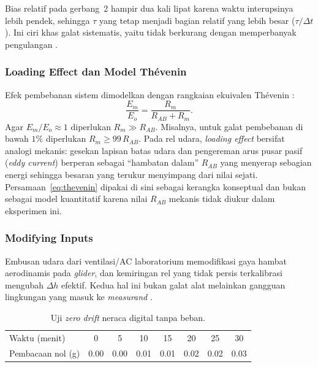 \documentclass[a4paper, 12pt]{article}
\begin{document}
\begin{multicols}{2}
            Bias relatif pada gerbang~2 hampir dua kali lipat karena waktu interupsinya lebih pendek, sehingga $\tau$ yang tetap menjadi bagian relatif yang lebih besar ($\tau/\Delta t$). Ini ciri khas galat sistematis, yaitu tidak berkurang dengan memperbanyak pengulangan \parencite{Taylor1997}.

            \subsubsection{Loading Effect dan Model Th\'evenin}
            Efek pembebanan sistem dimodelkan dengan rangkaian ekuivalen Th\'evenin \parencite{Bentley2005}:
            \begin{equation}
                \frac{E_m}{E_o}=\frac{R_m}{R_{AB}+R_m}.
                \label{eq:thevenin}
            \end{equation}
            Agar $E_m/E_o\approx1$ diperlukan $R_m\gg R_{AB}$. Misalnya, untuk galat pembebanan di bawah $1\%$ diperlukan $R_m\ge 99\,R_{AB}$. Pada rel udara, \textit{loading effect} bersifat analogi mekanis: gesekan lapisan batas udara dan pengereman arus pusar pasif (\textit{eddy current}) berperan sebagai ``hambatan dalam'' $R_{AB}$ yang menyerap sebagian energi sehingga besaran yang terukur menyimpang dari nilai sejati. Persamaan~\eqref{eq:thevenin} dipakai di sini sebagai kerangka konseptual dan bukan sebagai model kuantitatif karena nilai $R_{AB}$ mekanis tidak diukur dalam eksperimen ini.

            \subsubsection{Modifying Inputs}
            Embusan udara dari ventilasi/AC laboratorium memodifikasi gaya hambat aerodinamis pada \textit{glider}, dan kemiringan rel yang tidak persis terkalibrasi mengubah $\Delta h$ efektif. Kedua hal ini bukan galat alat melainkan gangguan lingkungan yang masuk ke \textit{measurand} \parencite{Bentley2005}.
\end{multicols}

\begin{table}[H]
\centering
\singlespacing
\caption{Uji \textit{zero drift} neraca digital tanpa beban.}
\label{tab:drift}
\small
\begin{tabular}{l *{7}{S[table-format=1.2]}}
\toprule
Waktu (menit) & {0} & {5} & {10} & {15} & {20} & {25} & {30}\\
Pembacaan nol (g) & 0.00 & 0.00 & 0.01 & 0.01 & 0.02 & 0.02 & 0.03\\
\bottomrule
\end{tabular}
\end{table}
\end{document}
